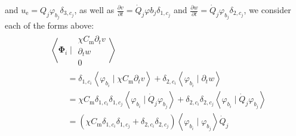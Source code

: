 \documentclass{article}
\newcommand{\bvec}[1]{\boldsymbol{#1}}
\begin{document}
and $u_\text{e} = Q_j \varphi_{b_j} \delta_{3, c_j}$,
as well as $\frac{\partial v}{\partial t} = \dot{Q}_j \varphi{b}_j \delta_{1, c_j}$
and $\frac{\partial w}{\partial t} = \dot{Q}_j \varphi_{b_j} \delta_{2, c_j}$,
we consider each of the forms above:
\begin{align*}
    & \left< \bvec{\Phi}_i \mid \begin{matrix}
            \chi C_\text{m} \partial_t v \\
            \partial_t w \\
            0
        \end{matrix} \right> \\
    & \qquad = \delta_{1, c_i} \left< \varphi_{b_i} \mid \chi C_\text{m} \partial_t v \right>
        + \delta_{2, c_i} \left< \varphi_{b_i} \mid \partial_t w \right> \\
    & \qquad = \chi C_\text{m} \delta_{1, c_i} \delta_{1, c_j} \left< \varphi_{b_i} \mid \dot{Q}_j \varphi_{b_j} \right>
        + \delta_{2, c_i} \delta_{2, c_j} \left< \varphi_{b_i} \mid \dot{Q}_j \varphi_{b_j} \right> \\
    & \qquad = (\chi C_\text{m} \delta_{1, c_i} \delta_{1, c_j} + \delta_{2, c_i} \delta_{2, c_j})
        \left< \varphi_{b_i} \mid \varphi_{b_j} \right> \dot{Q}_j
\end{align*}
\end{document}
